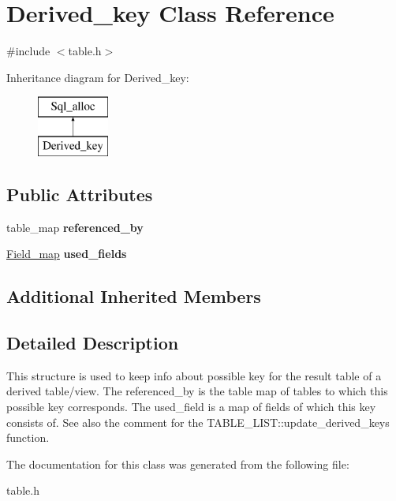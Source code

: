 \hypertarget{classDerived__key}{}\section{Derived\+\_\+key Class Reference}
\label{classDerived__key}


{\ttfamily \#include $<$table.\+h$>$}

Inheritance diagram for Derived\+\_\+key\+:\begin{figure}[H]
\begin{center}
\leavevmode
\includegraphics[height=2.000000cm]{classDerived__key}
\end{center}
\end{figure}
\subsection*{Public Attributes}
\begin{DoxyCompactItemize}
\item 
\mbox{\label{classDerived__key_a60f179b56b48b3766b0587b809424313}} 
table\+\_\+map {\bfseries referenced\+\_\+by}
\item 
\mbox{\label{classDerived__key_aba9bd7afe2685fa0847fd3b91c8e4399}} 
\mbox{\hyperlink{classBitmap}{Field\+\_\+map}} {\bfseries used\+\_\+fields}
\end{DoxyCompactItemize}
\subsection*{Additional Inherited Members}


\subsection{Detailed Description}
This structure is used to keep info about possible key for the result table of a derived table/view. The \textquotesingle{}referenced\+\_\+by\textquotesingle{} is the table map of tables to which this possible key corresponds. The \textquotesingle{}used\+\_\+field\textquotesingle{} is a map of fields of which this key consists of. See also the comment for the T\+A\+B\+L\+E\+\_\+\+L\+I\+S\+T\+::update\+\_\+derived\+\_\+keys function. 

The documentation for this class was generated from the following file\+:\begin{DoxyCompactItemize}
\item 
table.\+h\end{DoxyCompactItemize}

